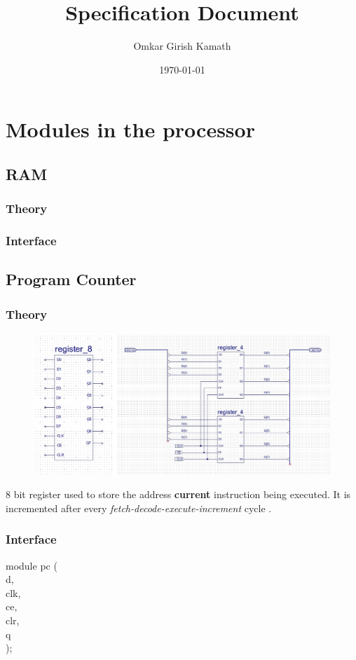 \documentclass[11pt]{article}
\author{Omkar Girish Kamath}
\date{\today}
\title{Specification Document}
\begin{document}
\maketitle
\tableofcontents

\section{Modules in the processor}
\label{sec:orga7cb9c0}
\subsection{RAM}
\label{sec:orga8fe5ad}
\subsubsection{Theory}
\label{sec:org753cf2b}
\subsubsection{Interface}
\label{sec:org899eb12}
\subsection{Program Counter}
\label{sec:org4995f51}
\subsubsection{Theory}
\label{sec:org913cfa5}
\begin{figure}[htbp]
\centering
\includegraphics[width=.9\linewidth]{./images/reg8.jpg}
\caption{\label{fig:org85e7ab1}
}
\end{figure}
8 bit register used to store the address \textbf{current} instruction being executed.
It is incremented after every \emph{fetch-decode-execute-increment} cycle .
\subsubsection{Interface}
\label{sec:org4b00782}
module pc (\\
d,\\
clk,\\
ce,\\
clr,\\
q\\
);
\end{document}
